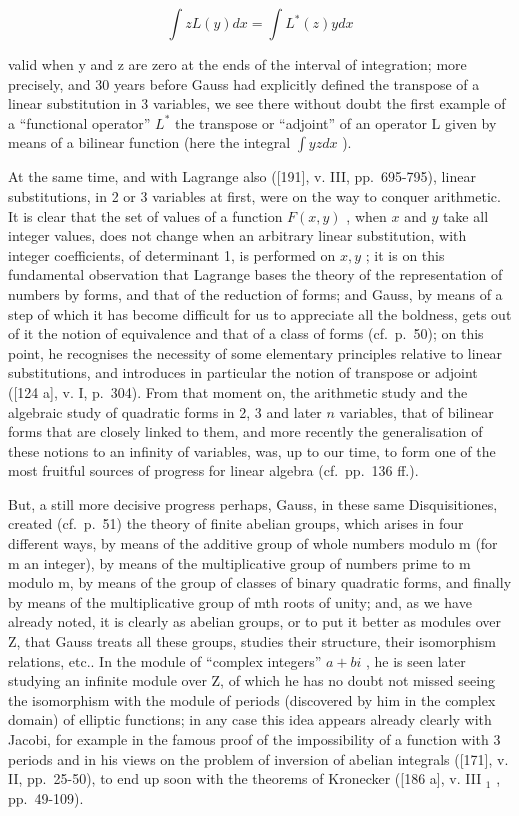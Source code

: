 \[
\int z L (y) d x = \int L ^ {*} (z) y d x
\]

valid when y and z are zero at the ends of the interval of integration; more precisely, and 30 years before Gauss had explicitly defined the transpose of a linear substitution in 3 variables, we see there without doubt the first example of a ``functional operator'' \(L^{*}\) the transpose or ``adjoint'' of an operator L given by means of a bilinear function (here the integral \(\int yzdx\) ).

At the same time, and with Lagrange also ({[}191{]}, v. III, pp.~695-795), linear substitutions, in 2 or 3 variables at first, were on the way to conquer arithmetic. It is clear that the set of values of a function \(F(x, y)\) , when \(x\) and \(y\) take all integer values, does not change when an arbitrary linear substitution, with integer coefficients, of determinant 1, is performed on \(x, y\) ; it is on this fundamental observation that Lagrange bases the theory of the representation of numbers by forms, and that of the reduction of forms; and Gauss, by means of a step of which it has become difficult for us to appreciate all the boldness, gets out of it the notion of equivalence and that of a class of forms (cf.~p.~50); on this point, he recognises the necessity of some elementary principles relative to linear substitutions, and introduces in particular the notion of transpose or adjoint ({[}124 a{]}, v. I, p.~304). From that moment on, the arithmetic study and the algebraic study of quadratic forms in 2, 3 and later \(n\) variables, that of bilinear forms that are closely linked to them, and more recently the generalisation of these notions to an infinity of variables, was, up to our time, to form one of the most fruitful sources of progress for linear algebra (cf.~pp.~136 ff.).

But, a still more decisive progress perhaps, Gauss, in these same Disquisitiones, created (cf.~p.~51) the theory of finite abelian groups, which arises in four different ways, by means of the additive group of whole numbers modulo m (for m an integer), by means of the multiplicative group of numbers prime to m modulo m, by means of the group of classes of binary quadratic forms, and finally by means of the multiplicative group of mth roots of unity; and, as we have already noted, it is clearly as abelian groups, or to put it better as modules over Z, that Gauss treats all these groups, studies their structure, their isomorphism relations, etc.. In the module of ``complex integers'' \(a + bi\) , he is seen later studying an infinite module over Z, of which he has no doubt not missed seeing the isomorphism with the module of periods (discovered by him in the complex domain) of elliptic functions; in any case this idea appears already clearly with Jacobi, for example in the famous proof of the impossibility of a function with 3 periods and in his views on the problem of inversion of abelian integrals ({[}171{]}, v. II, pp.~25-50), to end up soon with the theorems of Kronecker ({[}186 a{]}, v. III \(_{1}\) , pp.~49-109).

